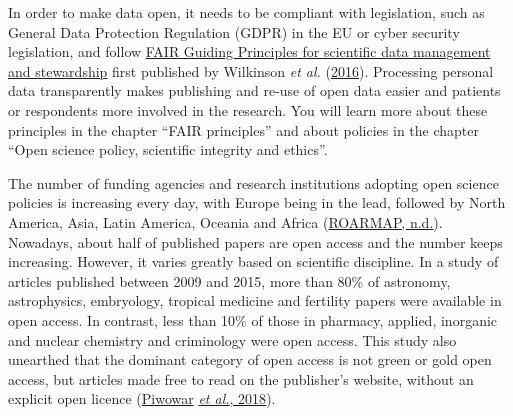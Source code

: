 \documentclass[
]{book}
\begin{document}
In order to make data open, it needs to be compliant with legislation, such as General Data Protection Regulation (GDPR) in the EU or cyber security legislation, and follow \href{http://www.nature.com/articles/sdata201618}{FAIR Guiding Principles for scientific data management and stewardship} first published by Wilkinson \emph{et al.} (\href{https://www.nature.com/articles/sdata201618}{2016}). Processing personal data transparently makes publishing and re-use of open data easier and patients or respondents more involved in the research. You will learn more about these principles in the chapter ``FAIR principles'' and about policies in the chapter ``Open science policy, scientific integrity and ethics''.

The number of funding agencies and research institutions adopting open science policies is increasing every day, with Europe being in the lead, followed by North America, Asia, Latin America, Oceania and Africa (\href{https://roarmap.eprints.org/}{ROARMAP, n.d.}). Nowadays, about half of published papers are open access and the number keeps increasing. However, it varies greatly based on scientific discipline. In a study of articles published between 2009 and 2015, more than 80\% of astronomy, astrophysics, embryology, tropical medicine and fertility papers were available in open access. In contrast, less than 10\% of those in pharmacy, applied, inorganic and nuclear chemistry and criminology were open access. This study also unearthed that the dominant category of open access is not green or gold open access, but articles made free to read on the publisher's website, without an explicit open licence (\href{https://peerj.com/articles/4375/?utm_source=TrendMD\&utm_campaign=PeerJ_Tre\%20ndMD_0\&utm_medium=TrendMD}{Piwowar} \href{https://peerj.com/articles/4375/?utm_source=TrendMD\&utm_campaign=PeerJ_Tre\%20ndMD_0\&utm_medium=TrendMD}{\emph{et al.}, 2018}).
\end{document}
